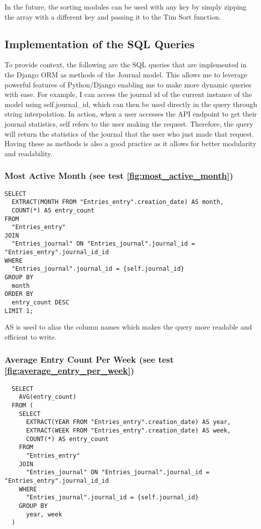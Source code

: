 In the future, the sorting modules can be used with any key by simply zipping the array with a different key and passing it to the Tim Sort function. 


\subsection{Implementation of the SQL Queries}
To provide context, the following are the SQL queries that are implemented in the Django ORM as methods of the Journal model. This allows me to leverage powerful features of Python/Django enabling me to make more dynamic queries with ease. For example, I can access the journal id of the current instance of the model using self.journal\_id, which can then be used directly in the query through string interpolation. In action, when a user accesses the API endpoint to get their journal statistics, self refers to the user making the request. Therefore, the query will return the statistics of the journal that the user who just made that request. Having these as methods is also a good practice as it allows for better modularity and readability.


\subsubsection{Most Active Month (see test \ref{fig:most_active_month})}
\begin{verbatim}
SELECT
  EXTRACT(MONTH FROM "Entries_entry".creation_date) AS month,
  COUNT(*) AS entry_count
FROM
  "Entries_entry"
JOIN
  "Entries_journal" ON "Entries_journal".journal_id = "Entries_entry".journal_id_id
WHERE
  "Entries_journal".journal_id = {self.journal_id}
GROUP BY
  month
ORDER BY
  entry_count DESC
LIMIT 1;
\end{verbatim}

AS is used to alias the column names which makes the query more readable and efficient to write.

\subsubsection{Average Entry Count Per Week (see test \ref{fig:average_entry_per_week})}
\begin{verbatim}
  SELECT
    AVG(entry_count)
  FROM (
    SELECT
      EXTRACT(YEAR FROM "Entries_entry".creation_date) AS year,
      EXTRACT(WEEK FROM "Entries_entry".creation_date) AS week,
      COUNT(*) AS entry_count
    FROM
      "Entries_entry"
    JOIN
      "Entries_journal" ON "Entries_journal".journal_id = "Entries_entry".journal_id_id
    WHERE
      "Entries_journal".journal_id = {self.journal_id}
    GROUP BY
      year, week
  )
\end{verbatim}

